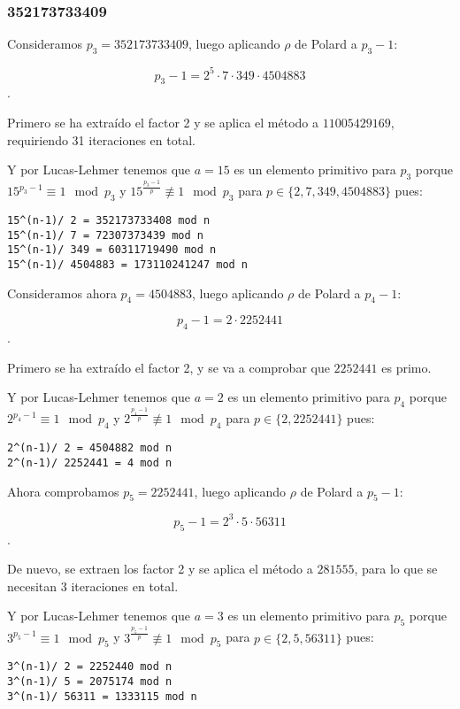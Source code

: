 \documentclass[a4paper]{article}
\begin{document}
\subsubsection{352173733409}
Consideramos $p_3=352173733409$, luego aplicando $\rho$ de Polard a $p_3-1$:

$$p_3-1=2^5 \cdot 7 \cdot 349\cdot 4504883$$.

Primero se ha extraído el factor 2 y se aplica el método a $11005429169$, requiriendo 31 iteraciones en total.

Y por Lucas-Lehmer tenemos que $a=15$ es un elemento primitivo para $p_3$ porque $15^{p_3-1}\equiv 1\mod p_3$ y $15^{\frac{p_3-1}{p}}\not\equiv 1\mod p_3 $ para $p\in\{2, 7, 349, 4504883\}$ pues:

\begin{verbatim}
15^(n-1)/ 2 = 352173733408 mod n
15^(n-1)/ 7 = 72307373439 mod n
15^(n-1)/ 349 = 60311719490 mod n
15^(n-1)/ 4504883 = 173110241247 mod n
\end{verbatim}

Consideramos ahora $p_4=4504883$, luego aplicando $\rho$ de Polard a $p_4-1$:

$$p_4-1=2 \cdot 2252441$$.

Primero se ha extraído el factor 2, y se va a comprobar que $2252441$ es primo.

Y por Lucas-Lehmer tenemos que $a=2$ es un elemento primitivo para $p_4$ porque $2^{p_4-1}\equiv 1\mod p_4$ y $2^{\frac{p_4-1}{p}}\not\equiv 1\mod p_4 $ para $p\in\{2, 2252441\}$ pues:

\begin{verbatim}
2^(n-1)/ 2 = 4504882 mod n
2^(n-1)/ 2252441 = 4 mod n
\end{verbatim}

Ahora comprobamos $p_5=2252441$, luego aplicando $\rho$ de Polard a $p_5-1$:

$$p_5-1=2^3 \cdot 5\cdot 56311$$.

De nuevo, se extraen los factor 2 y se aplica el método a $281555$, para lo que se necesitan 3 iteraciones en total.

Y por Lucas-Lehmer tenemos que $a=3$ es un elemento primitivo para $p_5$ porque $3^{p_5-1}\equiv 1\mod p_5$ y $3^{\frac{p_5-1}{p}}\not\equiv 1\mod p_5 $ para $p\in\{2, 5, 56311\}$ pues:

\begin{verbatim}
3^(n-1)/ 2 = 2252440 mod n
3^(n-1)/ 5 = 2075174 mod n
3^(n-1)/ 56311 = 1333115 mod n
\end{verbatim}
\end{document}
